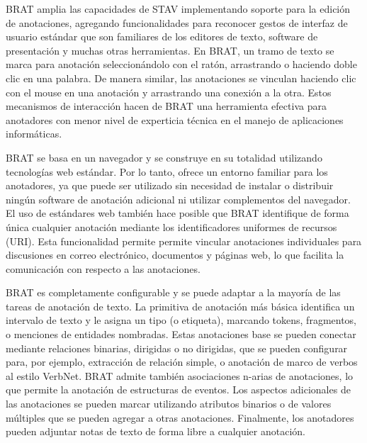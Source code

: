 BRAT amplia las capacidades de STAV implementando soporte para la edición de anotaciones, agregando funcionalidades para reconocer gestos de interfaz de usuario estándar que son familiares de los editores de texto, software de presentación y muchas otras herramientas.
En BRAT, un tramo de texto se marca para anotación seleccionándolo con el ratón, arrastrando o haciendo doble clic en una palabra.
De manera similar, las anotaciones se vinculan haciendo clic con el mouse en una anotación y arrastrando una conexión a la otra.
Estos mecanismos de interacción hacen de BRAT una herramienta efectiva para anotadores con menor nivel de experticia técnica en el manejo de aplicaciones informáticas.

BRAT se basa en un navegador y se construye en su totalidad utilizando tecnologías web estándar.
Por lo tanto, ofrece un entorno familiar para los anotadores, ya que puede ser utilizado sin necesidad de instalar o distribuir ningún software de anotación adicional ni utilizar complementos del navegador.
El uso de estándares web también hace posible que BRAT identifique de forma única cualquier anotación mediante los identificadores uniformes de recursos (URI).
Esta funcionalidad permite permite vincular anotaciones individuales para discusiones en correo electrónico, documentos y páginas web, lo que facilita la comunicación con respecto a las anotaciones.

BRAT es completamente configurable y se puede adaptar a la mayoría de las tareas de anotación de texto.
La primitiva de anotación más básica identifica un intervalo de texto y le asigna un tipo (o etiqueta), marcando tokens, fragmentos, o menciones de entidades nombradas.
Estas anotaciones base se pueden conectar mediante relaciones binarias, dirigidas o no dirigidas, que se pueden configurar para, por ejemplo, extracción de relación simple, o anotación de marco de verbos al estilo VerbNet.
BRAT admite también asociaciones n-arias de anotaciones, lo que permite la anotación de estructuras de eventos.
Los aspectos adicionales de las anotaciones se pueden marcar utilizando atributos binarios o de valores múltiples que se pueden agregar a otras anotaciones.
Finalmente, los anotadores pueden adjuntar notas de texto de forma libre a cualquier anotación.

